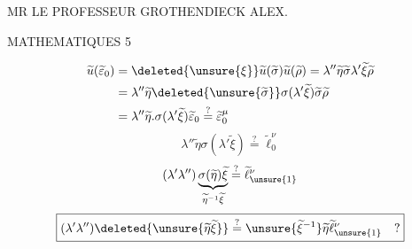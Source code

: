 MR LE PROFESSEUR GROTHENDIECK ALEX.

MATHEMATIQUES \hfill 5

\deleted{\[
\widetilde u(\widetilde\sigma)
=\lambda''\operatorname{int}(\widetilde\beta)(\widetilde\sigma)
\]
\[
\widetilde u(\widetilde\sigma^2)
=\lambda''{}^2\operatorname{int}(\widetilde\beta)
 \bigl(\underbrace{\widetilde\sigma^2}_{\widetilde\omega_0}\bigr)
=\lambda''{}^2\widetilde\omega_0^{\varepsilon_2}
\overset?=\widetilde u(\widetilde\omega_0)
=\widetilde\omega_0^\mu
\]}

\[
\begin{aligned}
\widetilde u(\widetilde\varepsilon_0)
 &=\deleted{\unsure{\xi}}\widetilde u(\widetilde\sigma)\widetilde u(\widetilde\rho)
 =\lambda''\widetilde\eta\widetilde\sigma\lambda'\widetilde\xi\widetilde\rho\\
 &=\lambda''\widetilde\eta\deleted{\unsure{\widetilde\sigma}}
     \sigma(\lambda'\widetilde\xi)\widetilde\sigma\widetilde\rho\\
 &=\lambda''\widetilde\eta.\sigma(\lambda'\widetilde\xi)
   \widetilde\varepsilon_0\overset?=\widetilde\varepsilon_0^\mu
\end{aligned}
\]
\[
\lambda''\widetilde\eta\sigma(\lambda'\widetilde\xi)
 \overset?=\widetilde\ell_0^\nu
\]
\[
(\lambda'\lambda'')
 \underbrace{\sigma(\widetilde\eta)\widetilde\xi}
 _{\widetilde\eta^{-1}\widetilde\xi}
 \overset?=\widetilde\ell_{\unsure{1}}^\nu
\]
\margin{\[
\widetilde\eta=\widetilde\beta\sigma(\widetilde\beta^{-1})
\]
\[
\sigma(\widetilde\eta)=\sigma(\widetilde\beta)\widetilde\beta^{-1}
=\widetilde\eta^{-1}
\]}
\[
\boxed{(\lambda'\lambda'')\deleted{\unsure{\widetilde\eta\widetilde\xi}}
 \overset?=\unsure{\widetilde\xi^{-1}}\widetilde\eta
 \widetilde\ell_{\unsure{1}}^\nu\quad ?}
\]
